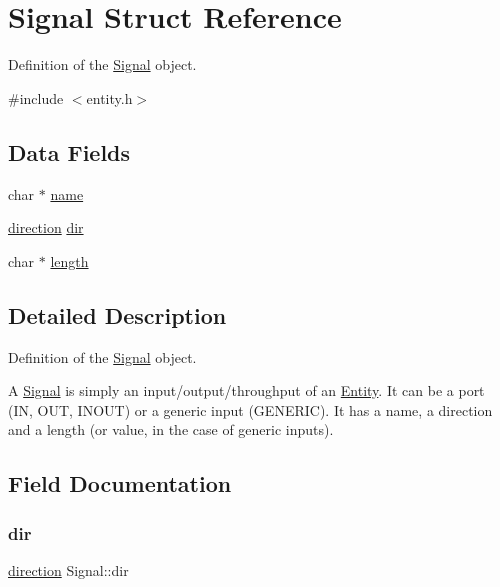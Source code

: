 \hypertarget{struct_signal}{}\section{Signal Struct Reference}
\label{struct_signal}


Definition of the \mbox{\hyperlink{struct_signal}{Signal}} object.  




{\ttfamily \#include $<$entity.\+h$>$}

\subsection*{Data Fields}
\begin{DoxyCompactItemize}
\item 
char $\ast$ \mbox{\hyperlink{struct_signal_aa56a667fa506981792ae32a5320217f3}{name}}
\item 
\mbox{\hyperlink{entity_8h_a99f26e6ee9fcd62f75203b5402df8098}{direction}} \mbox{\hyperlink{struct_signal_ad1a7815aca8678de29388b9306c0d106}{dir}}
\item 
char $\ast$ \mbox{\hyperlink{struct_signal_a64c670733f0f14bc0733ef85ce26c210}{length}}
\end{DoxyCompactItemize}


\subsection{Detailed Description}
Definition of the \mbox{\hyperlink{struct_signal}{Signal}} object. 

A \mbox{\hyperlink{struct_signal}{Signal}} is simply an input/output/throughput of an \mbox{\hyperlink{struct_entity}{Entity}}. It can be a port (IN, O\+UT, I\+N\+O\+UT) or a generic input (G\+E\+N\+E\+R\+IC). It has a name, a direction and a length (or value, in the case of generic inputs). 

\subsection{Field Documentation}
\mbox{\label{struct_signal_ad1a7815aca8678de29388b9306c0d106}} 
\subsubsection{\texorpdfstring{dir}{dir}}
{\footnotesize\ttfamily \mbox{\hyperlink{entity_8h_a99f26e6ee9fcd62f75203b5402df8098}{direction}} Signal\+::dir}

